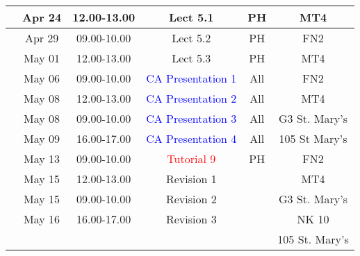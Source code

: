 \documentclass[11pt,oneside,a4paper]{article}
\begin{document}
\begin{center}
\begin{tabular}{||c||c|c|c|c|c||}
                                      & Apr 24   & 12.00-13.00 & Lect  5.1  & PH  & MT4   \\
\hline
\multirow{2}{*}{\color{red}{Week 42}} & Apr 29   & 09.00-10.00 & Lect  5.2  & PH   & FN2 \\
                                      & May 01   & 12.00-13.00 & Lect  5.3  & PH  & MT4  \\
\hline
\multirow{4}{*}{\color{red}{Week 43}} & May 06   & 09.00-10.00 & \textcolor{blue}{CA Presentation 1}  & All  & FN2 \\
                                      & May 08   & 12.00-13.00 & \textcolor{blue}{CA Presentation 2}  & All & MT4 \\
                                      & May 08   & 09.00-10.00 & \textcolor{blue}{CA Presentation 3}  & All & G3 St. Mary's \\
                                      & May 09   & 16.00-17.00 & \textcolor{blue}{CA Presentation 4}  & All & 105 St Mary's \\
\hline
\multirow{5}{*}{\color{red}{Week 44}} & May 13   & 09.00-10.00 & \textcolor{red}{Tutorial 9}  & PH   & FN2  \\
                                      & May 15   & 12.00-13.00 & Revision 1  &     & MT4 \\
                                      & May 15   & 09.00-10.00 & Revision 2  &     & G3 St. Mary's \\
                                      & May 16   & 16.00-17.00 & Revision 3  &     & NK 10 \\
                                      &          &             &             &     & 105 St. Mary's \\
\hline

\hline\hline

\end{tabular}
\end{center}
\end{document}
